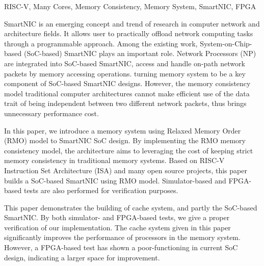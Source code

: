 \documentclass[supercite,notofont]{HustGraduPaper}
\begin{document}
\begin{enabstract}{RISC-V, Many Cores, Memory Consistency, Memory System, SmartNIC, FPGA}

SmartNIC is an emerging concept and trend of research in computer network and
architecture fields. It allows user to practically offload network computing
tasks through a programmable approach. Among the existing work,
System-on-Chip-based (SoC-based) SmartNIC plays an important role. Network
Processors (NP) are integrated into SoC-based SmartNIC, access and handle
on-path network packets by memory accessing operations. turning memory system
to be a key component of SoC-based SmartNIC designs. However, the memory
consistency model traditional computer architectures cannot make efficient use
of the data trait of being independent between two different network packets,
thus brings unnecessary performance cost.

In this paper, we introduce a memory system using Relaxed Memory Order (RMO)
model to SmartNIC SoC design. By implementing the RMO memory consistency model,
the architecture aims to leveraging the cost of keeping strict memory
consistency in traditional memory systems. Based on RISC-V Instruction Set
Architecture (ISA) and many open source projects, this paper builds a SoC-based
SmartNIC using RMO model. Simulator-based and FPGA-based tests are also
performed for verification purposes.

This paper demonstrates the building of cache system, and partly the SoC-based
SmartNIC. By both simulator- and FPGA-based tests, we give a proper verification
of our implementation. The cache system given in this paper significantly
improves the performance of processors in the memory system. However, a
FPGA-based test has shown a poor-functioning in current SoC design, indicating
a larger space for improvement.

\end{enabstract}

\tableofcontents[level=2]

\clearpage








\end{document}
